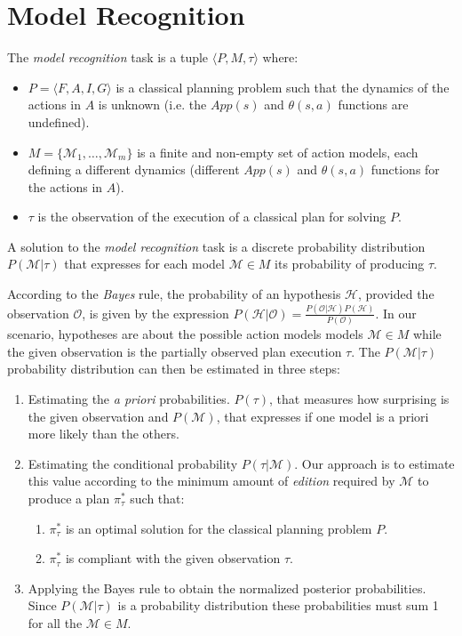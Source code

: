 \documentclass[letterpaper]{article} %
\newcommand{\tup}[1]{{\langle #1 \rangle}}
\begin{document}
\section{Model Recognition}
\label{sec:recognition}
The {\em model recognition} task is a tuple $\tup{P,M,\tau}$ where:
\begin{itemize}
\item $P=\tup{F,A,I,G}$ is a classical planning problem such that the dynamics of the actions in $A$ is unknown (i.e. the $App(s)$ and $\theta(s,a)$ functions are undefined).
\item $M=\{\mathcal{M}_1,\ldots,\mathcal{M}_m\}$ is a finite and non-empty set of action models, each defining a different dynamics (different $App(s)$ and $\theta(s,a)$ functions for the actions in $A$).
\item $\tau$ is the observation of the execution of a classical plan for solving $P$.
\end{itemize}
A solution to the {\em model recognition} task is a discrete probability distribution $P(\mathcal{M}|\tau)$ that expresses for each model $\mathcal{M}\in M$ its probability of producing $\tau$.

According to the {\em Bayes} rule, the probability of an hypothesis $\mathcal{H}$, provided the observation $\mathcal{O}$, is given by the expression $P(\mathcal{H}|\mathcal{O})=\frac{P(\mathcal{O}|\mathcal{H})P(\mathcal{H})}{P(\mathcal{O})}$. In our scenario, hypotheses are about the possible action models models $\mathcal{M}\in M$ while the given observation is the partially observed plan execution $\tau$. The $P(\mathcal{M}|\tau)$ probability distribution can then be estimated in three steps:
\begin{enumerate}
\item Estimating the {\em a priori} probabilities. $P(\tau)$, that measures how surprising is the given observation and $P(\mathcal{M})$, that expresses if one model is a priori more likely than the others. 
\item Estimating the conditional probability $P(\tau|\mathcal{M})$.  Our approach is to estimate this value according to the minimum amount of {\em edition} required by $\mathcal{M}$ to produce a plan $\pi^*_\tau$ such that:
\begin{enumerate}
\item $\pi^*_\tau$ is an optimal solution for the classical planning problem $P$. 
\item $\pi^*_\tau$ is compliant with the given observation $\tau$.
\end{enumerate}
\item Applying the Bayes rule to obtain the normalized posterior probabilities. Since $P(\mathcal{M}|\tau)$ is a probability distribution these probabilities must sum 1 for all the $\mathcal{M}\in M$.
\end{enumerate}
\end{document}
